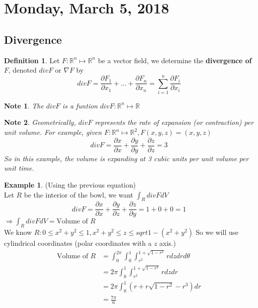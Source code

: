 \documentclass[12pt]{article}
\theoremstyle{plain}
\newtheorem*{note}{Note}
\theoremstyle{definition}
\newtheorem{definition}[theorem]{Definition}
\newtheorem{example}[theorem]{Example}
\begin{document}
\section{Monday, March 5, 2018}

\subsection{Divergence}

\begin{definition}
	Let $F : \mathbb{R}^n \mapsto \mathbb{R}^n$ be a vector field, we determine the \textbf{divergence of $F$}, denoted $div F$ or $\nabla F$ by
	$$div F = \frac{\partial F_1}{\partial x_1} + ... + \frac{\partial F_n}{\partial x_n} = \sum_{i=1}^n \frac{\partial F_i}{\partial x_i}$$
\end{definition}

\begin{note}
		The $div F$ is a funtion $div F : \mathbb{R}^n \mapsto \mathbb{R}$
\end{note}
\begin{note}
	Geometrically, $div F$ represents the rate of expansion (or contraction) per unit volume. For example, given $F:\mathbb{R}^n \mapsto \mathbb{R}^2, F(x,y,z) = (x,y,z)$
	$$div F = \frac{\partial x}{\partial x} + \frac{\partial y}{\partial y} + \frac{\partial z}{\partial z} = 3$$
	So in this example, the volume is expanding at 3 cubic units per unit volume per unit time.
\end{note}

\begin{example}
	(Using the previous equation)\\
	Let $R$ be the interior of the bowl, we want $\int_R div F dV$
	$$div F = \frac{\partial x}{\partial x} + \frac{\partial y}{\partial z} + \frac{\partial z}{\partial y} = 1 + 0 + 0 = 1$$
	$\Longrightarrow \int_R div F dV = \text{Volume of $R$}$\\
	We know $R : 0 \leq x^2 + y^2 \leq 1, x^2 + y^2 \leq z \leq sqrt{1 - (x^2 + y^2)}$
	So we will use cylindrical coordinates (polar coordinates with a $z$ axis.)
	\begin{align*}
		\text{Volume of $R$} &=  \int_0^{2\pi} \int^1_0 \int^{1+\sqrt{1-r^2}}_{r^2} rdzdrd\theta\\
		&= 2\pi  \int^1_0 \int^{1+\sqrt{1-r^2}}_{r^2} r dzdr\\
		&=  2\pi  \int^1_0 (r+ r\sqrt{1-r^2} - r^3)dr\\
		&= \frac{7\pi}{6}
	\end{align*}
\end{example}
\end{document}
